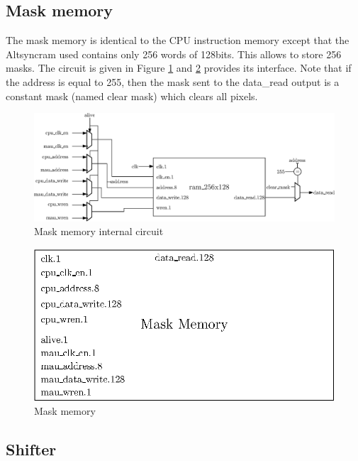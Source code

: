 \subsection{Mask memory}

The mask memory is identical to the CPU instruction memory except that the Altsyncram used contains 
only 256 words of 128bits. This allows to store 256 masks. The circuit is given in Figure
\ref{fig:gpu/mask_memory_in} and \ref{fig:gpu/mask_memory} provides its interface. Note that if the 
address is equal to 255, then the mask sent to the data\_read output is a constant mask 
(named clear mask) which clears all pixels.

\begin{figure}[H]
    \centering
    \includegraphics[width=\linewidth]{Chapter4-GPU_CLKU/res/mask_memory_in}
    \caption{Mask memory internal circuit}
    \label{fig:gpu/mask_memory_in}
\end{figure}

\begin{figure}[H]
    \centering
    \includegraphics[scale=0.8]{Chapter4-GPU_CLKU/res/mask_memory}
    \caption{Mask memory}
    \label{fig:gpu/mask_memory}
\end{figure}

\subsection{Shifter}

